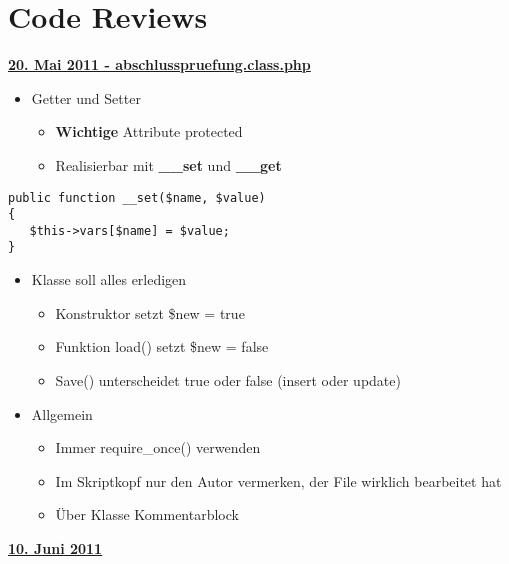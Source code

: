 \chapter{Code Reviews}
\underline{{\bf 20. Mai 2011 - abschlusspruefung.class.php}}
\begin{itemize}
	\item Getter und Setter
		\begin{itemize}
			\item {\bf Wichtige} Attribute protected
			\item Realisierbar mit {\bf \_\_set} und {\bf \_\_get}
		\end{itemize}
\end{itemize}
\begin{verbatim}
public function __set($name, $value)
{
   $this->vars[$name] = $value;
}
\end{verbatim}
\begin{itemize}
	\item Klasse soll alles erledigen
		\begin{itemize}
		\item Konstruktor setzt \$new = true
		\item Funktion load() setzt \$new = false
		\item Save() unterscheidet true oder false (insert oder update)
		\end{itemize}
\end{itemize}
\begin{itemize}
	\item Allgemein
		\begin{itemize}
		\item Immer require\_once() verwenden
		\item Im Skriptkopf nur den Autor vermerken, der File wirklich bearbeitet hat
		\item \"Uber Klasse Kommentarblock \newline
		\end{itemize}
\end{itemize}
\underline{{\bf 10. Juni 2011}}
